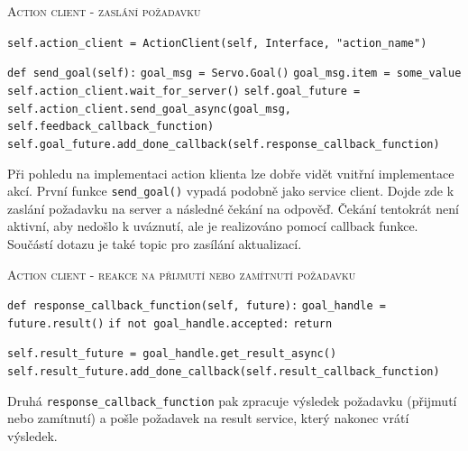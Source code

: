 \begin{algorithm}[h!]
	\label{}
	\caption{\textsc{Action client - zaslání požadavku}}
	
	\DontPrintSemicolon
	\SetAlgoNoLine
	\SetNlSty{}{}{:}
	\SetNlSkip{-1.1em}
	
	\BlankLine \Indp\Indpp
	
 	\texttt{self.action\_client = ActionClient(self, Interface, "action\_name")}\;
 	
 	\BlankLine
 	\texttt{def send\_goal(self):}\;
 	\Indp\Indp
 	\texttt{goal\_msg = Servo.Goal()}\;
 	\texttt{goal\_msg.item = some\_value}\;
 	\texttt{self.action\_client.wait\_for\_server()}\;
 	\texttt{self.goal\_future = self.action\_client.send\_goal\_async(goal\_msg, self.feedback\_callback\_function)}\;
 	\texttt{self.goal\_future.add\_done\_callback(self.response\_callback\_function)}\;
	\Indm\Indm
    
\end{algorithm}
Při pohledu na implementaci action klienta lze dobře vidět vnitřní implementace akcí. První funkce \verb|send_goal()| vypadá podobně jako service client. Dojde zde k zaslání požadavku na server a následné čekání na odpověď. Čekání tentokrát není aktivní, aby nedošlo k uváznutí, ale je realizováno pomocí callback funkce. Součástí dotazu je také topic pro zasílání aktualizací. \cite{ros2_documentation}
\newpage

\begin{algorithm}[h!]
	\label{}
	\caption{\textsc{Action client - reakce na přijmutí nebo zamítnutí požadavku}}
	
	\DontPrintSemicolon
	\SetAlgoNoLine
	\SetAlgoNlRelativeSize{-1}
	\SetNlSty{}{}{:}
	\SetNlSkip{-1.1em}
	
	\BlankLine \Indp\Indpp
	
	\texttt{def response\_callback\_function(self, future):}\;
	\Indp\Indp
	\texttt{goal\_handle = future.result()}\;
	\texttt{if not goal\_handle.accepted:}\;
	\Indp\Indp
	\texttt{return}\;
	\Indm\Indm
	
	\BlankLine
	\texttt{self.result\_future = goal\_handle.get\_result\_async()}\;
	\texttt{self.result\_future.add\_done\_callback(self.result\_callback\_function)}\;
	\Indm\Indm
	
\end{algorithm}
Druhá \verb|response_callback_function| pak zpracuje výsledek požadavku (přijmutí nebo zamítnutí) a pošle požadavek na result service, který nakonec vrátí výsledek. \cite{ros2_documentation}

